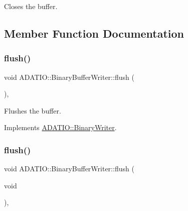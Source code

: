 Closes the buffer. 



\subsection{Member Function Documentation}
\mbox{\label{classADATIO_1_1BinaryBufferWriter_accc3319508a804b054d21b6bddeef85d}} 
\subsubsection{\texorpdfstring{flush()}{flush()}\hspace{0.1cm}{\footnotesize\ttfamily [1/3]}}
{\footnotesize\ttfamily void A\+D\+A\+T\+I\+O\+::\+Binary\+Buffer\+Writer\+::flush (\begin{DoxyParamCaption}{ }\end{DoxyParamCaption})\hspace{0.3cm}{\ttfamily [inline]}, {\ttfamily [virtual]}}



Flushes the buffer. 



Implements \mbox{\hyperlink{classADATIO_1_1BinaryWriter_a1d335eeed64094b8641f3ebf731c981e}{A\+D\+A\+T\+I\+O\+::\+Binary\+Writer}}.

\mbox{\label{classADATIO_1_1BinaryBufferWriter_accc3319508a804b054d21b6bddeef85d}} 
\subsubsection{\texorpdfstring{flush()}{flush()}\hspace{0.1cm}{\footnotesize\ttfamily [2/3]}}
{\footnotesize\ttfamily void A\+D\+A\+T\+I\+O\+::\+Binary\+Buffer\+Writer\+::flush (\begin{DoxyParamCaption}\item[{void}]{ }\end{DoxyParamCaption})\hspace{0.3cm}{\ttfamily [inline]}, {\ttfamily [virtual]}}



